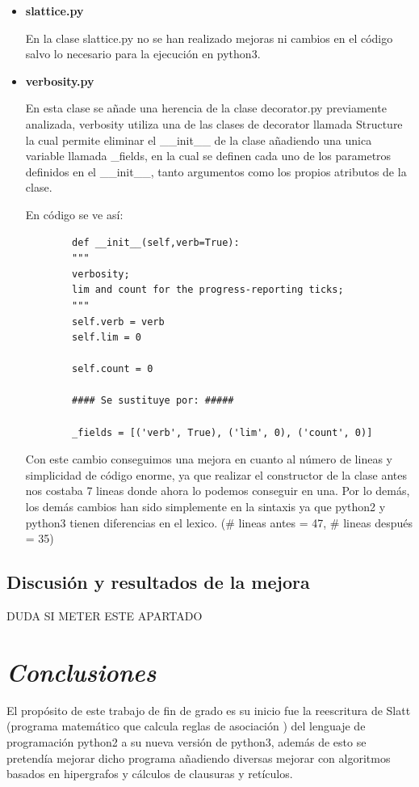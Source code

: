 \documentclass{cosas/tfg_domingo}
\begin{document}
\begin{itemize}
\item \textbf{slattice.py}

En la clase slattice.py no se han realizado mejoras ni cambios en el código salvo lo necesario para la ejecución en python3.
    
\item \textbf{verbosity.py}

En esta clase se añade una herencia de la clase decorator.py previamente analizada, verbosity utiliza una de las clases de decorator llamada Structure la cual permite eliminar el \_\_init\_\_ de la clase añadiendo una unica variable llamada \_fields, en la cual se definen cada uno de los parametros definidos en el \_\_init\_\_, tanto argumentos como los propios atributos de la clase.

En código se ve así:
\begin{verbatim}
        def __init__(self,verb=True):
        """
        verbosity;
        lim and count for the progress-reporting ticks;
        """
        self.verb = verb
        self.lim = 0
        
        self.count = 0
        
        #### Se sustituye por: #####
        
        _fields = [('verb', True), ('lim', 0), ('count', 0)]
\end{verbatim}

Con este cambio conseguimos una mejora en cuanto al número de lineas y simplicidad de código enorme, ya que realizar el constructor de la clase antes nos costaba 7 lineas donde ahora lo podemos conseguir en una. Por lo demás, los demás cambios han sido simplemente en la sintaxis ya que python2 y python3 tienen diferencias en el lexico. (\# lineas antes = 47, \# lineas después = 35)
\end{itemize}

\section{Discusión y resultados de la mejora}

DUDA SI METER ESTE APARTADO

\chapter{\emph{Conclusiones}}

El propósito de este trabajo de fin de grado es su inicio fue la reescritura de Slatt (programa matemático que calcula reglas de asociación ) del lenguaje de programación python2 a su nueva versión de python3, además de esto se pretendía mejorar dicho programa añadiendo diversas mejorar con algoritmos basados en hipergrafos y cálculos de clausuras y retículos.
\end{document}
